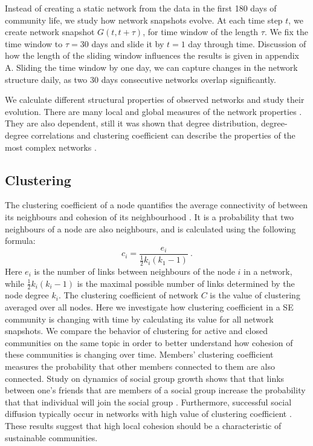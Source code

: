 Instead of creating a static network from the data in the first 180 days of community life, we study how network snapshots evolve. At each time step $t$, we create network snapshot $G(t, t+\tau)$, for time window of the length $\tau$. We fix the time window to $\tau=30$ days and slide it by $t=1$ day through time. Discussion of how the length of the sliding window influences the results is given in appendix A. Sliding the time window by one day, we can capture changes in the network structure daily, as two 30 days consecutive networks overlap significantly. 

We calculate different structural properties of observed networks and study their evolution. There are many local and global measures of the network properties \cite{boccaletti2006complex}. They are also dependent, still it was shown that degree distribution, degree-degree correlations and clustering coefficient can describe the properties of the most complex networks \cite{orsini2015quantifying}. 






\subsection{Clustering}
The clustering coefficient of a node quantifies the average connectivity of between its neighbours and cohesion of its neighbourhood \cite{boccaletti2006complex}. It is a probability that two neighbours of a node are also neighbours, and is calculated using the following formula:
\begin{equation}
	c_{i}=\frac{e_{i}}{\frac{1}{2}k_{i}(k_{1}-1)} \ .
	\label{eq:clust}
\end{equation}
Here $e_{i}$ is the number of links between neighbours of the node $i$ in a network, while $\frac{1}{2}k_{i}(k_{i}-1)$ is the maximal possible number of links determined by the node degree $k_{i}$. The clustering coefficient of network $C$ is the value of clustering averaged over all nodes. Here we investigate how clustering coefficient in a SE community is changing with time by calculating its value for all network snapshots. We compare the behavior of clustering for active and closed communities on the same topic in order to better understand how cohesion of these communities is changing over time. 
Members' clustering coefficient measures the probability that other members connected to them are also connected. Study on dynamics of social group growth shows that that links between one's friends that are members of a social group increase the probability that that individual will join the social group \cite{backstrom2006group}. Furthermore, successful social diffusion  typically occur in networks with high value of clustering coefficient \cite{centola2007cascade}. These results suggest that high local cohesion should be a characteristic of sustainable communities.

